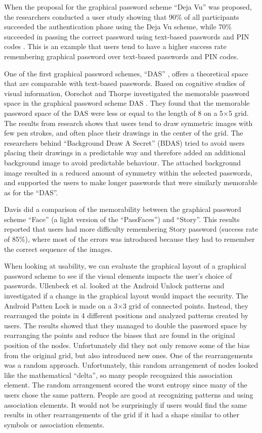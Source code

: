     When the proposal for the graphical password scheme ``Deja Vu'' was proposed, the researchers conducted a user study showing that 90\% of all participants succeeded the authentication phase using the Deja Vu scheme, while 70\% succeeded in passing the correct password using text-based passwords and PIN codes \cite{DejaVu}. This is an example that users tend to have a higher success rate remembering graphical password over text-based passwords and PIN codes. 

    One of the first graphical password schemes, ``DAS'' \cite{Jermyn}, offers a theoretical space that are comparable with text-based passwords. Based on cognitive studies of visual information, Oorschot and Thorpe \cite{Thorpe1} investigated the memorable password space in the graphical password scheme DAS \cite{Jermyn}. They found that the memorable password space of the DAS were less or equal to the length of 8 on a 5$\times$5 grid. The results from research shows that users tend to draw symmetric images with few pen strokes, and often place their drawings in the center of the grid. The researchers behind ``Background Draw A Secret'' (BDAS) \cite{BDAS} tried to avoid users placing their drawings in a predictable way and therefore added an additional background image to avoid predictable behaviour. The attached background image resulted in a reduced amount of symmetry within the selected passwords, and supported the users to make longer passwords that were similarly memorable as for the ``DAS''.

    Davis \cite{Davis} did a comparison of the memorability between the graphical password scheme ``Face'' (a light version of the ``PassFaces'') and ``Story''. This results reported that users had more difficulty remembering Story password (success rate of 85\%), where most of the errors was introduced because they had to remember the correct sequence of the images.

    When looking at usability, we can evaluate the graphical layout of a graphical password scheme to see if the visual elements impacts the user's choice of passwords. Ullenbeck et al. \cite{Uellenbeck} looked at the Android Unlock patterns and investigated if a change in the graphical layout would impact the security. The Android Patten Lock is made on a 3$\times$3 grid of connected points. Instead, they rearranged the points in 4 different positions and analyzed patterns created by users. The results showed that they managed to double the password space by rearranging the points and reduce the biases that are found in the original position of the nodes. Unfortunately did they not only remove some of the bias from the original grid, but also introduced new ones. One of the rearrangements was a random approach. Unfortunately, this random arrangement of nodes looked like the mathematical ``delta'', so many people recognized this association element. The random arrangement scored the worst entropy since many of the users chose the same pattern. People are good at recognizing patterns and using association elements. It would not be surprisingly if users would find the same results in other rearrangements of the grid if it had a shape similar to other symbols or association elements.

